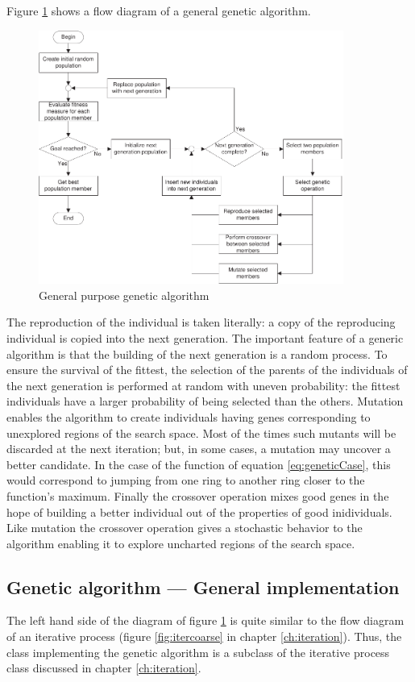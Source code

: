 \documentclass[twoside]{book}
\begin{document}
Figure \ref{fig:geneticFlow} shows a flow diagram of a general
genetic algorithm.
\begin{figure}
\centering\includegraphics[width=10cm]{Figures/GeneticFlow}
\caption{General purpose genetic algorithm}\label{fig:geneticFlow}
\end{figure}
The reproduction of the individual is taken literally: a copy of
the reproducing individual is copied into the next generation. The
important feature of a generic algorithm is that the building of
the next generation is a random process. To ensure the survival of
the fittest, the selection of the parents of the individuals of
the next generation is performed at random with uneven
probability: the fittest individuals have a larger probability of
being selected than the others. Mutation enables the algorithm to
create individuals having genes corresponding to unexplored
regions of the search space. Most of the times such mutants will
be discarded at the next iteration; but, in some cases, a mutation
may uncover a better candidate. In the case of the function of
equation \ref{eq:geneticCase}, this would correspond to jumping
from one ring to another ring closer to the function's maximum.
Finally the crossover operation mixes good genes in the hope of
building a better individual out of the properties of good
inidividuals. Like mutation the crossover operation gives a
stochastic behavior to the algorithm enabling it to explore
uncharted regions of the search space.


\subsection{Genetic algorithm --- General implementation}
\label{sec:gengenetic} The left hand side of the diagram of figure
\ref{fig:geneticFlow} is quite similar to the flow diagram of an
iterative process (\cf figure \ref{fig:itercoarse} in chapter
\ref{ch:iteration}). Thus, the class implementing the genetic
algorithm is a subclass of the iterative process class discussed
in chapter \ref{ch:iteration}.
\end{document}
